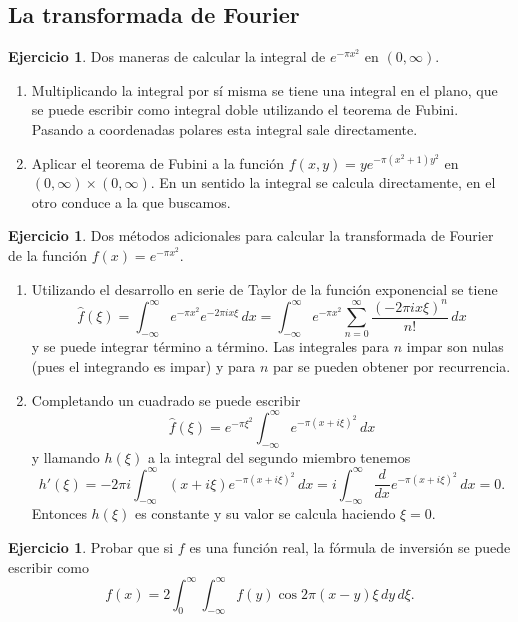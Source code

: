 \documentclass[12pt, a4paper]{amsbook}
\theoremstyle{remark}
\theoremstyle{definition}
\newtheorem{ejer}[teo]{Ejercicio}
\numberwithin{section}{chapter}
\numberwithin{subsection}{section}
\numberwithin{equation}{section}
\numberwithin{figure}{chapter}
\begin{document}
\subsection*{La transformada de Fourier}

\begin{ejer}
Dos maneras de calcular la integral de $e^{-\pi x^2}$ en $(0,\infty)$.
\begin{enumerate}
\item Multiplicando la integral por sí misma se tiene una integral en el plano, que se puede escribir como integral doble utilizando el teorema de Fubini. Pasando a coordenadas polares esta integral sale directamente.

\item Aplicar el teorema de Fubini a la función $f(x, y)=ye^{-\pi(x^2+1)y^2}$ en $(0, \infty)\times(0, \infty)$. En un sentido la integral se calcula directamente, en el otro conduce a la que buscamos.
\end{enumerate}
\end{ejer}

\begin{ejer}
Dos métodos adicionales para calcular la transformada de Fourier de la función $f(x)=e^{-\pi x^2}$.
\begin{enumerate}
\item Utilizando el desarrollo en serie de Taylor de la función exponencial se tiene
$$
\hat f(\xi) = \int_{-\infty}^\infty e^{-\pi x^2} e^{-2\pi ix\xi}\, dx = \int_{-\infty}^\infty e^{-\pi x^2} \sum_{n=0}^\infty \frac{(-2\pi i x\xi)^n}{n!}\, dx
$$
y se puede integrar término a término. Las integrales para $n$ impar son nulas (pues el integrando es impar) y para $n$ par se pueden obtener por recurrencia.

\item Completando un cuadrado se puede escribir
$$
\hat f(\xi) = e^{-\pi \xi^2} \int_{-\infty}^\infty e^{-\pi (x+i\xi)^2}\, dx
$$
y llamando $h(\xi)$ a la integral del segundo miembro tenemos
$$
h'(\xi)=-2\pi i\int_{-\infty}^\infty (x+i\xi) e^{-\pi (x+i\xi)^2}\, dx = i \int_{-\infty}^\infty \frac{d}{dx} e^{-\pi (x+i\xi)^2}\, dx=0.
$$
Entonces $h(\xi)$ es constante y su valor se calcula haciendo $\xi=0$.
\end{enumerate}
\end{ejer}

\begin{ejer}
Probar que si $f$ es una función real, la fórmula de inversión se puede escribir como
$$
f(x) = 2\int_0^\infty \int_{-\infty}^\infty f(y) \cos 2\pi (x-y)\xi\, dy\, d\xi.
$$
\end{ejer}
\end{document}
